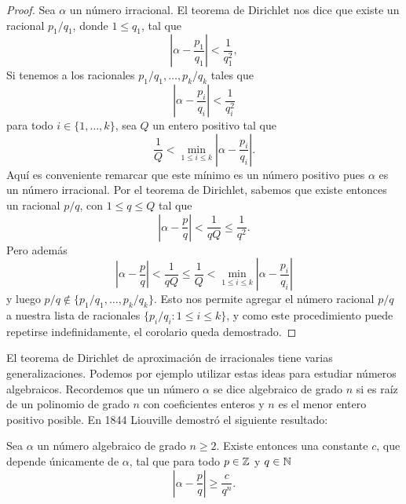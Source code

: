 \begin{proof}
	Sea $\alpha$ un número irracional.  
	El teorema de Dirichlet nos dice que existe un racional $p_1/q_1$, donde 
	$1\leq q_1$, tal que 
	\[
		\left|\alpha-\frac{p_1}{q_1}\right|<\frac{1}{q_1^2},
	\]
	Si tenemos a los racionales $p_1/q_1,\dots,p_k/q_k$ tales que 
	\[
		\left|\alpha-\frac{p_i}{q_i}\right|<\frac{1}{q_i^2}
	\]
	para todo $i\in\{1,\dots,k\}$, sea $Q$ un entero positivo tal que 
	\[
		\frac{1}{Q}<\min_{1\leq i\leq k}\left|\alpha-\frac{p_i}{q_i}\right|.
	\]
	Aquí es conveniente remarcar que este mínimo es un número positivo pues
	$\alpha$ es un número irracional. Por el teorema de Dirichlet, sabemos que
	existe entonces un racional $p/q$, con $1\leq q\leq Q$ tal que 
	\[
		\left|\alpha-\frac{p}{q}\right|<\frac{1}{qQ}\leq\frac{1}{q^2}.
	\]
	Pero además 
	\[
		\left|\alpha-\frac{p}{q}\right|<\frac{1}{qQ}\leq\frac{1}{Q}<\min_{1\leq i\leq k}\left|\alpha-\frac{p_i}{q_i}\right|
	\]
	y luego $p/q\not\in\{p_1/q_1,\dots,p_k/q_k\}$. Esto nos permite agregar el
	número racional $p/q$ a nuestra lista de racionales $\{p_i/q_i:1\leq i\leq
	k\}$, y como este procedimiento puede repetirse indefinidamente, el
	corolario queda demostrado.
\end{proof}

El teorema de Dirichlet de aproximación de irracionales tiene varias
generalizaciones. Podemos por ejemplo utilizar estas ideas para estudiar
números algebraicos. Recordemos que un número $\alpha$ se dice algebraico de
grado $n$ si es raíz de un polinomio de grado $n$ con coeficientes enteros y
$n$ es el menor entero positivo posible.  En 1844 Liouville demostró el
siguiente resultado:

\begin{theorem}[Liouville]
	Sea $\alpha$ un número algebraico de grado $n\geq2$. Existe entonces una
	constante $c$, que depende únicamente de $\alpha$, tal que para todo
	$p\in\mathbb{Z}$ y $q\in\mathbb{N}$ 
	\[
		\left|\alpha-\frac{p}{q}\right|\geq \frac{c}{q^n}.
	\]
\end{theorem}

